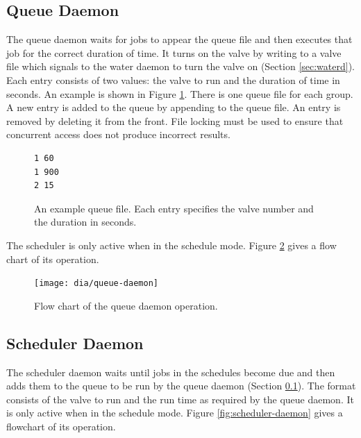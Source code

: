 \documentclass{article}
\begin{document}
\clearpage
\FloatBarrier
\subsection{Queue Daemon}
\label{sec:queue}

The queue daemon waits for jobs to appear the queue file
and then executes that job for the correct duration of time.
It turns on the valve by writing to a valve file which signals
to the water daemon to turn the valve on (Section \ref{sec:waterd}).
Each entry consists of two values: the valve to run and the
duration of time in seconds.
An example is shown in Figure \ref{fig:qf2}.
There is one queue file for each group.
A new entry is added to the queue by appending to the queue file.
An entry is removed by deleting it from the front.
File locking must be used to ensure that concurrent access does not
produce incorrect results.

\begin{figure}[h!]
\begin{center}
\begin{minipage}{2in}
\begin{verbatim}
1 60
1 900
2 15
\end{verbatim}
\end{minipage}
\end{center}
\caption{An example queue file.  Each entry specifies the valve
number and the duration in seconds.}
\label{fig:qf2}
\end{figure}

The scheduler is only active when in the schedule mode.
Figure \ref{fig:queue-daemon} gives a flow chart of its operation.

\begin{figure}[h!]
\begin{center}
\texttt{[image: dia/queue-daemon]}
\end{center}
\caption{Flow chart of the queue daemon operation.}
\label{fig:queue-daemon}
\end{figure}


\clearpage
\FloatBarrier
\subsection{Scheduler Daemon}

The scheduler daemon waits until jobs in the schedules
become due and then adds them to the queue to be run
by the queue daemon (Section \ref{sec:queue}).
The format consists of the valve to run and the run time as
required by the queue daemon.
It is only active when in the schedule mode.
Figure \ref{fig:scheduler-daemon} gives a flowchart of its operation.
\end{document}
